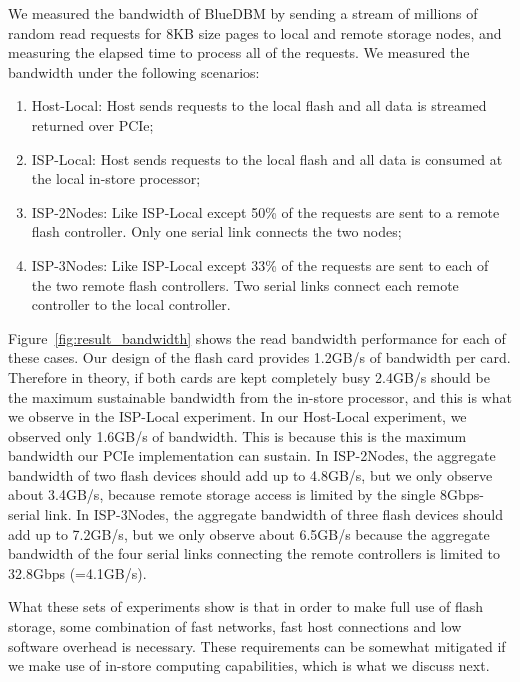 We measured the bandwidth of BlueDBM by sending a stream of millions of random read requests for 8KB size pages to local and remote storage nodes, and measuring the elapsed time to process all of the requests.
We measured the bandwidth under the following scenarios:
\begin{enumerate}
\item Host-Local: Host sends requests to the local flash and all data is streamed returned over PCIe;
\item ISP-Local: Host sends requests to the local flash and all data is consumed at the local in-store processor;
\item ISP-2Nodes: Like ISP-Local except 50\% of the requests are sent to a remote flash controller. Only one serial link connects the two nodes;
\item ISP-3Nodes: Like ISP-Local except 33\% of the requests are sent to each of the two remote flash controllers. Two serial links connect each remote controller to the local controller.
\end{enumerate}

Figure~\ref{fig:result_bandwidth} shows the read bandwidth performance for each of these cases. Our design of the flash card provides 1.2GB/s of bandwidth per card. Therefore in theory, if both cards are kept completely busy 2.4GB/s should be the maximum sustainable bandwidth from the in-store processor, and this is what we observe in the ISP-Local experiment. In our Host-Local experiment, we observed only 1.6GB/s of bandwidth. This is because this is the maximum bandwidth our PCIe implementation can sustain. In ISP-2Nodes, the aggregate bandwidth of two flash devices should add up to 4.8GB/s, but we only observe about 3.4GB/s, because remote storage access is limited by the single 8Gbps-serial link. In ISP-3Nodes, the aggregate bandwidth of three flash devices should add up to 7.2GB/s, but we only observe about 6.5GB/s because the aggregate bandwidth of the four serial links connecting the remote controllers is limited to 32.8Gbps (=4.1GB/s).

What these sets of experiments show is that in order to make full use of flash storage, some combination of fast networks, fast host connections and low software overhead is necessary. These requirements can be somewhat mitigated if we make use of in-store computing capabilities, which is what we discuss next.



